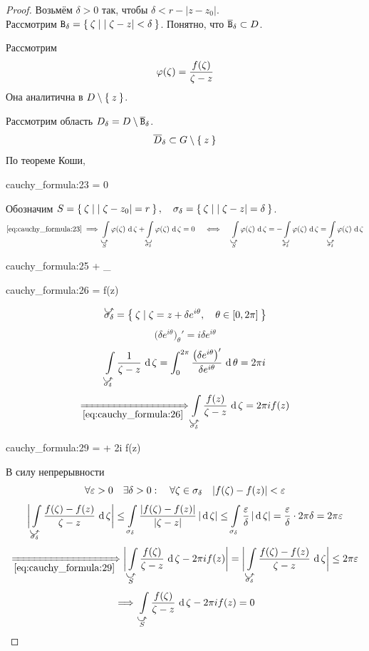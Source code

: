 \begin{proof}
	Возьмём $ \delta > 0 $ так, чтобы $ \delta < r - |z - z_0| $. \\
	Рассмотрим $ \mathtt B_\delta = \Set{\zeta \mid |\zeta - z| < \delta} $. Понятно, что $ \overline{\mathtt B}_\delta \subset D $.

	Рассмотрим
	$$ \varphi(\zeta) = \frac{f(\zeta)}{\zeta - z} $$
	Она аналитична в $ D \setminus \Set{z} $.

	Рассмотрим область $ D_\delta = D \setminus \overline{\mathtt B}_\delta $.
	$$ \overline D_\delta \subset G \setminus \Set z $$
	По теореме Коши,
	\begin{equ}{cauchy_formula:23}
		 = 0
	\end{equ}
	Обозначим $ S = \Set{\zeta \mid |\zeta - z_0| = r}, \quad \sigma_\delta = \Set{\zeta \mid |\zeta - z| = \delta} $.
	$$ \eref{cauchy_formula:23} \implies \cint[\zeta]{\curvedir S}{\vphi(\zeta)} + \cint[\zeta]{\curvedir[0]{\sigma_\delta}}{\phi(\zeta)} = 0 \quad \iff \quad \cint[\zeta]{\curvedir S}{\vphi(\zeta)} = - \cint[\zeta]{\curvedir[0]{\sigma_\delta}}{\vphi(\zeta)} = \cint[\zeta]{\curvedir{\sigma_\delta}}{\vphi(\zeta)} $$
	\begin{equ}{cauchy_formula:25}
		 \bdefeq\phi {} + \int\limits_{\curvedir{\sigma_\delta}}  \di \zeta
	\end{equ}
	\begin{equ}{cauchy_formula:26}
		 = f(z) 
	\end{equ}
	$$ \curvedir{\sigma_\delta} = \set{\zeta \mid \zeta = z + \delta e^{i\theta}, \quad \theta \in [0, 2\pi]} $$
	$$ \bigg( \delta e^{i\theta} \bigg)_\theta' = i \delta e^{i\theta} $$
	$$ \cint[\zeta]{\curvedir{\sigma_\delta}}{\frac1{\zeta - z}} = \dint[\theta]0{2\pi}{\frac{\big( \delta e^{i\theta} \big)'}{\delta e^{i\theta}}} = 2\pi i $$
	$$ \underimp{\eref{cauchy_formula:26}} \cint[\zeta]{\curvedir{\sigma_\delta}}{\frac{f(z)}{\zeta - z}} = 2\pi i f(z) $$
	\begin{equ}{cauchy_formula:29}
		  =  + 2\pi i f(z)
	\end{equ}
	В силу непрерывности
	$$ \forall \varepsilon > 0 \quad \exists \delta > 0 : \quad \forall \zeta \in \sigma_\delta \quad |f(\zeta) - f(z)| < \varepsilon $$
	$$ \bigg| \cint[\zeta]{\curvedir{\sigma_\delta}}{\frac{f(\zeta) - f(z)}{\zeta - z}} \bigg| \le \acint[\zeta]{\sigma_\delta}{\frac{|f(\zeta) - f(z)|}{|\zeta - z|}} \le \acint[\zeta]{\sigma_\delta}{\frac\eps\delta} = \frac\eps\delta \cdot 2\pi \delta = 2\pi \eps $$
	$$ \underimp{\eref{cauchy_formula:29}} \bigg| \cint[\zeta]{\curvedir S}{ \frac{f(\zeta)}{\zeta - z}} - 2 \pi i f(z) \bigg| = \bigg| \cint[\zeta]{\curvedir{\sigma_\delta}}{\frac{f(\zeta) - f(z)}{\zeta - z}} \bigg| \le 2\pi \eps $$
	$$ \implies \cint[\zeta]{\curvedir S}{\frac{f(\zeta)}{\zeta - z}} - 2\pi i f(z) = 0 $$
\end{proof}

